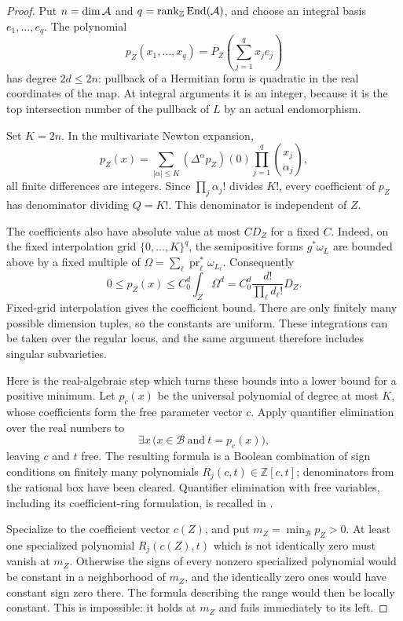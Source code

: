 \begin{proof}
Put $n=\dim\mathcal A$ and $q=\operatorname{rank}_{\mathbb Z}\operatorname{End}(\mathcal A)$, and choose
an integral basis $e_1,\ldots,e_q$.  The polynomial
\[
 p_Z(x_1,\ldots,x_q)
   =P_Z\left(\sum_{j=1}^q x_je_j\right)
\]
has degree $2d\le 2n$: pullback of a Hermitian form is quadratic in
the real coordinates of the map.  At integral arguments it is an
integer, because it is the top intersection number of the pullback of
$L$ by an actual endomorphism.

Set $K=2n$.  In the multivariate Newton expansion,
\[
 p_Z(x)=\sum_{|\alpha|\le K}(\Delta^\alpha p_Z)(0)
                 \prod_{j=1}^q\binom{x_j}{\alpha_j},
\]
all finite differences are integers.  Since
$\prod_j\alpha_j!$ divides $K!$, every coefficient of $p_Z$ has
denominator dividing $Q=K!$.  This denominator is independent of $Z$.

The coefficients also have absolute value at most $C D_Z$ for a fixed
$C$.  Indeed, on the fixed interpolation grid $\{0,\ldots,K\}^q$,
the semipositive forms $g^*\omega_L$ are bounded above by a fixed
multiple of
$\Omega=\sum_\ell\operatorname{pr}_\ell^*\omega_{L_\ell}$.
Consequently
\[
 0\le p_Z(x)\le C_0^d\int_Z\Omega^d
   =C_0^d\frac{d!}{\prod_\ell d_\ell!}D_Z.
\]
Fixed-grid interpolation gives the coefficient bound.  There are only
finitely many possible dimension tuples, so the constants are uniform.
These integrations can be taken over the regular locus, and the same
argument therefore includes singular subvarieties.

Here is the real-algebraic step which turns these bounds into a lower
bound for a positive minimum.  Let $p_c(x)$ be the universal polynomial
of degree at most $K$, whose coefficients form the free parameter vector
$c$.  Apply quantifier elimination over the real numbers to
\[
 \exists x\,\bigl(x\in\mathcal B\ \text{and}\ t=p_c(x)\bigr),
\]
leaving $c$ and $t$ free.  The resulting formula is a Boolean combination
of sign conditions on finitely many polynomials
$R_j(c,t)\in\mathbb Z[c,t]$; denominators from the rational box have
been cleared.  Quantifier elimination with free variables, including
its coefficient-ring formulation, is recalled in
\cite[arXiv version, Section~2.5.2, Theorem~2.27]{Basu2017}.

Specialize to the coefficient vector $c(Z)$, and put
$m_Z=\min_{\mathcal B}p_Z>0$.  At least one specialized polynomial
$R_j(c(Z),t)$ which is not identically zero must vanish at $m_Z$.
Otherwise the signs of every nonzero specialized polynomial would be
constant in a neighborhood of $m_Z$, and the identically zero ones
would have constant sign zero there.  The formula describing the range
would then be locally constant.  This is impossible: it holds at
$m_Z$ and fails immediately to its left.


\end{proof}
